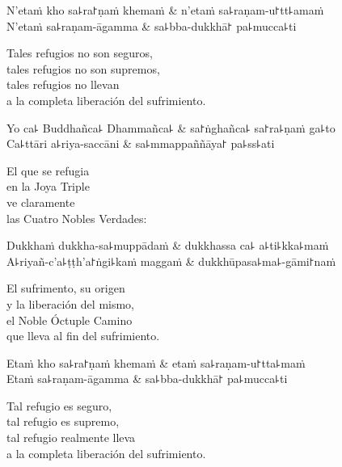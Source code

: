 \begin{twochants}
  N'etaṁ kho sa꜕ra꜓ṇaṁ khemaṁ & n'etaṁ sa꜕raṇam-u꜓tt꜕amaṁ \\
  N'etaṁ sa꜕raṇam-āgamma & sa꜕bba-dukkhā꜓ pa꜕mucca꜕ti \\
\end{twochants}

\begin{english}
  Tales refugios no son seguros,\\
  tales refugios no son supremos,\\
  tales refugios no llevan\\
  a la completa liberación del sufrimiento.
\end{english}

\begin{twochants}
  Yo ca꜕ Buddhañca꜕ Dhammañca꜕ & sa꜓ṅghañca꜕ sa꜓ra꜕ṇaṁ ga꜕to \\
  Ca꜕ttāri a꜕riya-saccāni & sa꜕mmappaññāya꜓ pa꜕ss꜕ati \\
\end{twochants}

\begin{english}
  El que se refugia\\
  en la Joya Triple\\
  ve claramente\\
  las Cuatro Nobles Verdades:
\end{english}

\begin{twochants}
  Dukkhaṁ dukkha-sa꜕muppādaṁ & dukkhassa ca꜕ a꜕ti꜕kka꜕maṁ \\
  A꜕riyañ-c'a꜕ṭṭh'a꜓ṅgi꜕kaṁ maggaṁ & dukkhūpasa꜕ma꜕-gāmi꜓naṁ \\
\end{twochants}

\begin{english}
  El sufrimento, su origen \\
  y la liberación del mismo,\\
  el Noble Óctuple Camino\\
  que lleva al fin del sufrimiento.
\end{english}

\begin{twochants}
  Etaṁ kho sa꜕ra꜓ṇaṁ khemaṁ & etaṁ sa꜕raṇam-u꜓tta꜕maṁ \\
  Etaṁ sa꜕raṇam-āgamma & sa꜕bba-dukkhā꜓ pa꜕mucca꜕ti \\
\end{twochants}

\begin{english}
  Tal refugio es seguro,\\
  tal refugio es supremo,\\
  tal refugio realmente lleva\\
  a la completa liberación del sufrimiento.
\end{english}

